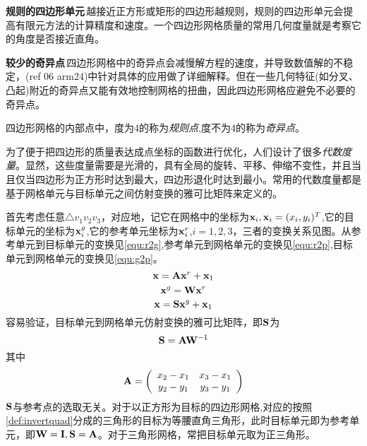 \textbf{规则的四边形单元}\,越接近正方形或矩形的四边形越规则，规则的四边形单元会提高有限元方法的计算精度和速度。一个四边形网格质量的常用几何度量就是考察它的角度是否接近直角。

\textbf{较少的奇异点}\,四边形网格中的奇异点会减慢解方程的速度，并导致数值解的不稳定，(ref 06 arm24)中针对具体的应用做了详细解释。但在一些几何特征(如分叉、凸起)附近的奇异点又能有效地控制网格的扭曲，因此四边形网格应避免不必要的奇异点。
\begin{definition}\label{singularity}
四边形网格的内部点中，度为4的称为\emph{规则点},度不为4的称为\emph{奇异点}。
\end{definition}

为了便于把四边形的质量表达成点坐标的函数进行优化，人们设计了很多\emph{代数度量}。显然，这些度量需要是光滑的，具有全局的旋转、平移、伸缩不变性，并且当且仅当四边形为正方形时达到最大，四边形退化时达到最小。常用的代数度量都是基于网格单元与目标单元之间仿射变换的雅可比矩阵来定义的。

首先考虑任意$\triangle v_1v_2v_3$，对应地，记它在网格中的坐标为$\mathbf{x}_i,\mathbf{x}_i=(x_i,y_i)^T$,它的目标单元的坐标为$\mathbf{x}^g_i$,它的参考单元坐标为$\mathbf{x}^r_i$,$i=1,2,3$，三者的变换关系见图。从参考单元到目标单元的变换见\ref{equ:r2g},参考单元到网格单元的变换见\ref{equ:r2p},目标单元到网格单元的变换见\ref{equ:g2p}。
\begin{equation}\label{equ:r2g}
\mathbf{x}=\mathbf{A} \mathbf{x}^r+\mathbf{x}_1
\end{equation}
\begin{equation}\label{equ:r2p}
\mathbf{x}^g=\mathbf{W} \mathbf{x}^r
\end{equation}
\begin{equation}\label{equ:g2p}
\mathbf{x}=\mathbf{S} \mathbf{x}^g+\mathbf{x}_1
\end{equation}
容易验证，目标单元到网格单元仿射变换的雅可比矩阵，即$\mathbf{S}$为
\begin{equation}\label{equ:aff-jacob}
\mathbf{S}=\mathbf{A} \mathbf{W}{^{-1}}
\end{equation}
其中
\begin{equation} \label{equ:affA}
\mathbf{A}=
\left(
\begin{array}{cc}
x_2-x_1 & x_3-x_1 \\ 
y_2-y_1 & y_3-y_1
\end{array} 
\right)
\end{equation}
$\mathbf{S}$与参考点的选取无关。对于以正方形为目标的四边形网格,对应的按照\ref{def:invertquad}分成的三角形的目标为等腰直角三角形，此时目标单元即为参考单元，即$\mathbf{W}=\mathbf{I},\mathbf{S}=\mathbf{A}$。对于三角形网格，常把目标单元取为正三角形。

